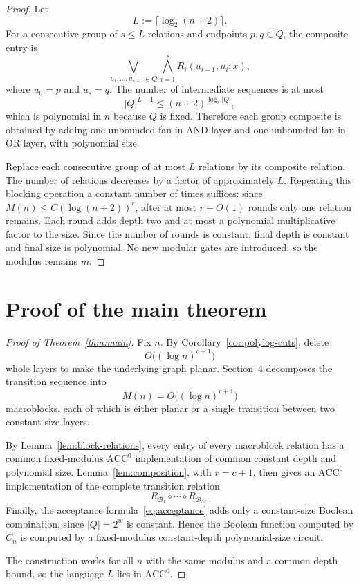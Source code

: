 \documentclass[11pt]{article}
\theoremstyle{definition}
\newcommand{\ACC}{\mathrm{ACC}^{0}}
\newcommand{\cB}{\mathcal{B}}
\begin{document}
\begin{proof}
Let
\[
  L:=\lceil\log_2(n+2)\rceil.
\]
For a consecutive group of $s\le L$ relations and endpoints $p,q\in Q$, the composite entry is
\begin{equation}\label{eq:explicit-composition}
  \bigvee_{u_1,\ldots,u_{s-1}\in Q}
  \bigwedge_{i=1}^{s}R_i(u_{i-1},u_i;x),
\end{equation}
where $u_0=p$ and $u_s=q$. The number of intermediate sequences is at most
\[
  |Q|^{L-1}
  \le (n+2)^{\log_2|Q|},
\]
which is polynomial in $n$ because $Q$ is fixed. Therefore each group composite is obtained by adding one unbounded-fan-in AND layer and one unbounded-fan-in OR layer, with polynomial size.

Replace each consecutive group of at most $L$ relations by its composite relation. The number of relations decreases by a factor of approximately $L$. Repeating this blocking operation a constant number of times suffices: since $M(n)\le C(\log(n+2))^r$, after at most $r+O(1)$ rounds only one relation remains. Each round adds depth two and at most a polynomial multiplicative factor to the size. Since the number of rounds is constant, final depth is constant and final size is polynomial. No new modular gates are introduced, so the modulus remains $m$.
\end{proof}

\section{Proof of the main theorem}

\begin{proof}[Proof of Theorem~\ref{thm:main}]
Fix $n$. By Corollary~\ref{cor:polylog-cuts}, delete
\[
  O\bigl((\log n)^{c+1}\bigr)
\]
whole layers to make the underlying graph planar. Section~4 decomposes the transition sequence into
\[
  M(n)=O\bigl((\log n)^{c+1}\bigr)
\]
macroblocks, each of which is either planar or a single transition between two constant-size layers.

By Lemma~\ref{lem:block-relations}, every entry of every macroblock relation has a common fixed-modulus $\ACC$ implementation of common constant depth and polynomial size. Lemma~\ref{lem:composition}, with $r=c+1$, then gives an $\ACC$ implementation of the complete transition relation
\[
  R_{\cB_1}\circ\cdots\circ R_{\cB_M}.
\]
Finally, the acceptance formula~\eqref{eq:acceptance} adds only a constant-size Boolean combination, since $|Q|=2^w$ is constant. Hence the Boolean function computed by $C_n$ is computed by a fixed-modulus constant-depth polynomial-size circuit.

The construction works for all $n$ with the same modulus and a common depth bound, so the language $L$ lies in $\ACC$.
\end{proof}
\end{document}
